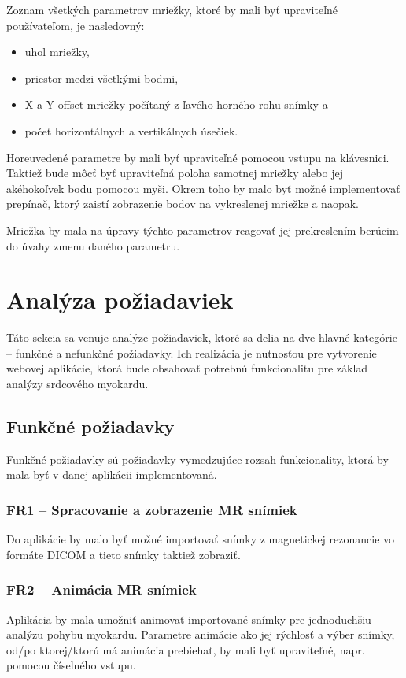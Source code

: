 Zoznam všetkých parametrov mriežky, ktoré by mali byť upraviteľné používateľom, je nasledovný:
\begin {itemize}
\item {uhol mriežky,}
\item {priestor medzi všetkými bodmi,}
\item {X a Y offset mriežky počítaný z ľavého horného rohu snímky a}
\item {počet horizontálnych a vertikálnych úsečiek.}
\end {itemize}

Horeuvedené parametre by mali byť upraviteľné pomocou vstupu na klávesnici.
Taktiež bude môcť byť upraviteľná poloha samotnej mriežky alebo jej akéhokoľvek bodu pomocou myši. Okrem toho by malo byť možné implementovať prepínač, ktorý zaistí zobrazenie  bodov na vykreslenej mriežke a naopak.

Mriežka by mala na úpravy týchto parametrov reagovať jej prekreslením berúcim do úvahy zmenu daného parametru.

\section {Analýza požiadaviek}
Táto sekcia sa venuje analýze požiadaviek, ktoré sa delia na dve hlavné kategórie -- funkčné a nefunkčné požiadavky. Ich realizácia je nutnosťou pre vytvorenie webovej aplikácie, ktorá bude obsahovať potrebnú funkcionalitu pre základ analýzy srdcového myokardu.

\subsection {Funkčné požiadavky}
Funkčné požiadavky sú požiadavky vymedzujúce rozsah funkcionality, ktorá by mala byť v danej aplikácii implementovaná.

\subsubsection {FR1 -- Spracovanie a zobrazenie MR snímiek}\label{fr1}
Do aplikácie by malo byť možné importovať snímky z magnetickej rezonancie vo formáte DICOM a tieto snímky taktiež zobraziť.

\subsubsection {FR2 -- Animácia MR snímiek}\label{fr2}
Aplikácia by mala umožniť animovať importované snímky pre jednoduchšiu analýzu pohybu myokardu. Parametre animácie ako jej rýchlosť a výber snímky, od/po ktorej/ktorú má animácia prebiehať, by mali byť upraviteľné, napr. pomocou číselného vstupu.

